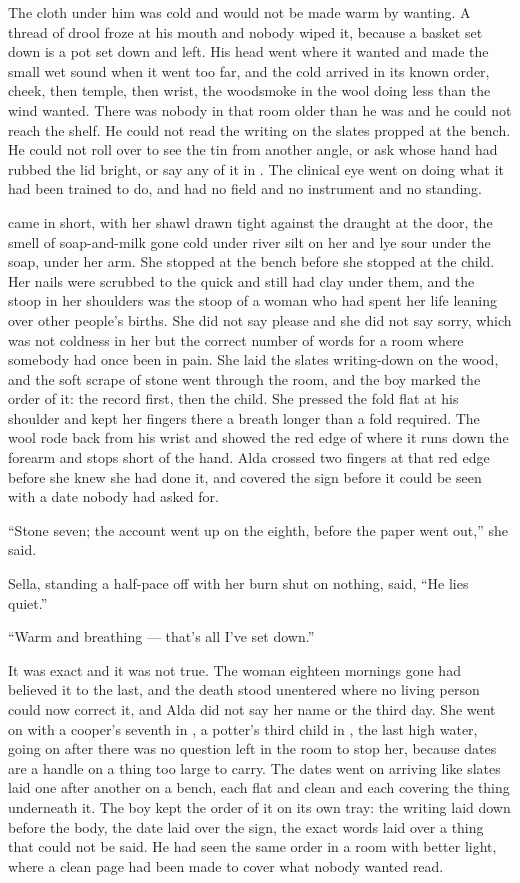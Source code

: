 The cloth under him was cold and would not be made warm by wanting. A thread of drool froze at his mouth and nobody wiped it, because a basket set down is a pot set down and left. His head went where it wanted and made the small wet sound when it went too far, and the cold arrived in its known order, cheek, then temple, then wrist, the woodsmoke in the wool doing less than the wind wanted. There was nobody in that room older than he was and he could not reach the shelf. He could not read the writing on the slates propped at the bench. He could not roll over to see the tin from another angle, or ask whose hand had rubbed the lid bright, or say any of it in . The clinical eye went on doing what it had been trained to do, and had no field and no instrument and no standing.

 came in short, with her shawl drawn tight against the draught at the door, the smell of soap-and-milk gone cold under river silt on her and lye sour under the soap,  under her arm. She stopped at the bench before she stopped at the child. Her nails were scrubbed to the quick and still had clay under them, and the stoop in her shoulders was the stoop of a woman who had spent her life leaning over other people's births. She did not say please and she did not say sorry, which was not coldness in her but the correct number of words for a room where somebody had once been in pain. She laid the slates writing-down on the wood, and the soft scrape of stone went through the room, and the boy marked the order of it: the record first, then the child. She pressed the fold flat at his shoulder and kept her fingers there a breath longer than a fold required. The wool rode back from his wrist and showed the red edge of  where it runs down the forearm and stops short of the hand. Alda crossed two fingers at that red edge before she knew she had done it, and covered the sign before it could be seen with a date nobody had asked for.

“Stone seven; the account went up on the eighth, before the paper went out,” she said.

Sella, standing a half-pace off with her burn shut on nothing, said, “He lies quiet.”

“Warm and breathing --- that's all I've set down.”

It was exact and it was not true. The woman eighteen mornings gone had believed it to the last, and the death stood unentered where no living person could now correct it, and Alda did not say her name or the third day. She went on with a cooper's seventh in , a potter's third child in , the last high water, going on after there was no question left in the room to stop her, because dates are a handle on a thing too large to carry. The dates went on arriving like slates laid one after another on a bench, each flat and clean and each covering the thing underneath it. The boy kept the order of it on its own tray: the writing laid down before the body, the date laid over the sign, the exact words laid over a thing that could not be said. He had seen the same order in a room with better light, where a clean page had been made to cover what nobody wanted read.

